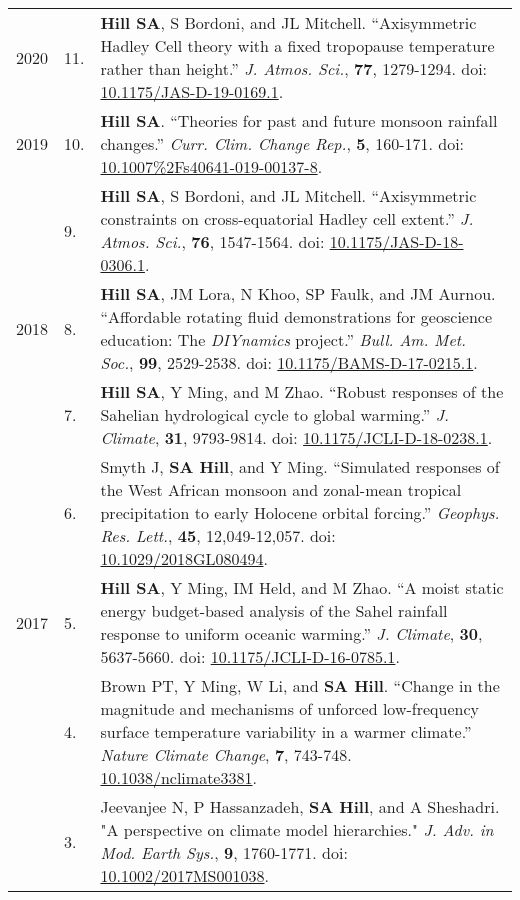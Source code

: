 \documentclass[letterpaper,11pt]{shillcv}
\begin{document}
\begin{longtable}{@{} Y{0.05\textwidth} >{\color{black}} p{0.04\textwidth} @{} L{0.91\textwidth} @{}}
2020 & 11. & \textbf{Hill SA}, S Bordoni, and JL Mitchell.
``Axisymmetric Hadley Cell theory with a fixed tropopause temperature rather
than height.'' \emph{J. Atmos. Sci.}, \textbf{77}, 1279-1294.  doi: \href{https://doi.org/10.1175/JAS-D-19-0169.1}{10.1175/JAS-D-19-0169.1}.\\
2019 & 10. & \textbf{Hill SA}.  ``Theories for past and future monsoon rainfall
changes.'' \emph{Curr. Clim. Change Rep.}, \textbf{5}, 160-171.  doi: \href{https://doi.org/10.1007\%2Fs40641-019-00137-8}{10.1007\%2Fs40641-019-00137-8}.\\
     & 9. & \textbf{Hill SA}, S Bordoni, and JL Mitchell.
``Axisymmetric constraints on cross-equatorial Hadley cell extent.''
\emph{J. Atmos. Sci.}, \textbf{76}, 1547-1564.  doi: \href{https://doi.org/10.1175/JAS-D-18-0306.1}{10.1175/JAS-D-18-0306.1}.\\
2018 & 8. & \textbf{Hill SA}, JM Lora, N Khoo, SP Faulk, and
JM Aurnou.  ``Affordable rotating fluid demonstrations for
geoscience education: The \emph{DIYnamics} project.''  \emph{Bull.
Am. Met. Soc.}, \textbf{99}, 2529-2538.  doi: \href{https://doi.org/10.1175/BAMS-D-17-0215.1}{10.1175/BAMS-D-17-0215.1}.\\
     & 7. & \textbf{Hill SA}, Y Ming, and M Zhao.  ``Robust responses of the
Sahelian hydrological cycle to global warming.''  \emph{J. Climate}, \textbf{31}, 9793-9814.  doi: \href{https://doi.org/10.1175/JCLI-D-18-0238.1}{10.1175/JCLI-D-18-0238.1}.\\
     & 6. & Smyth J, \textbf{SA Hill}, and Y Ming.  ``Simulated responses of
the West African monsoon and zonal-mean tropical precipitation to early
Holocene orbital forcing.''  \emph{Geophys. Res. Lett.}, \textbf{45},
12,049-12,057.  doi: \href{https://doi.org/10.1029/2018GL080494}{10.1029/2018GL080494}.\\
2017 & 5. & \textbf{Hill SA}, Y Ming, IM Held, and M Zhao.  ``A moist
static energy budget-based analysis of the Sahel rainfall response to uniform
oceanic warming.''  \emph{J. Climate}, \textbf{30}, 5637-5660.  doi: \href{https://doi.org/10.1175/JCLI-D-16-0785.1}{10.1175/JCLI-D-16-0785.1}.\\
     & 4. & Brown PT, Y Ming, W Li, and \textbf{SA Hill}.  ``Change
in the magnitude and mechanisms of unforced low-frequency surface temperature
variability in a warmer climate.''  \emph{Nature Climate Change}, \textbf{7}, 743-748.  \href{https://doi.org/10.1038/nclimate3381}{10.1038/nclimate3381}.\\
     & 3. & Jeevanjee N, P Hassanzadeh, \textbf{SA Hill}, and A Sheshadri.  "A perspective on climate model hierarchies."  \emph{J.  Adv. in Mod. Earth Sys.}, \textbf{9}, 1760-1771.  doi: \href{https://doi.org/10.1002/2017MS001038}{10.1002/2017MS001038}.\\

\end{longtable}
\end{document}
